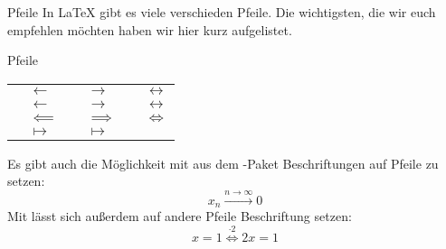 \begin{frame}[fragile]{Pfeile}
In \LaTeX{} gibt es viele verschieden Pfeile. Die wichtigsten, die wir euch empfehlen möchten haben wir hier kurz aufgelistet. 
\begin{block}{Pfeile}
\centering
\scriptsize
\begin{tabular}{*{3}{|rl}|}\hline
		 & $\leftarrow$ & 
		 & $\rightarrow$ &
		 & $\leftrightarrow$ \\
		 & $\longleftarrow$ & 
		 & $\longrightarrow$ &
		 & $\longleftrightarrow$ \\
		 & $\impliedby$ & 
		 & $\implies$ &
		 & $\iff$ \\
		 & $\mapsto$ & 
		 & $\longmapsto$ & 
		& \\ \hline
\end{tabular}
\end{block}\pause
Es gibt auch die Möglichkeit mit  aus dem -Paket Beschriftungen auf Pfeile zu setzen: 
\[
    x_n\xrightarrow{n\rightarrow\infty}0
\]
Mit  lässt sich außerdem auf andere Pfeile Beschriftung setzen: 
\[
    x=1 \overset{\cdot2}{\iff} 2x=1
\]
\end{frame}

